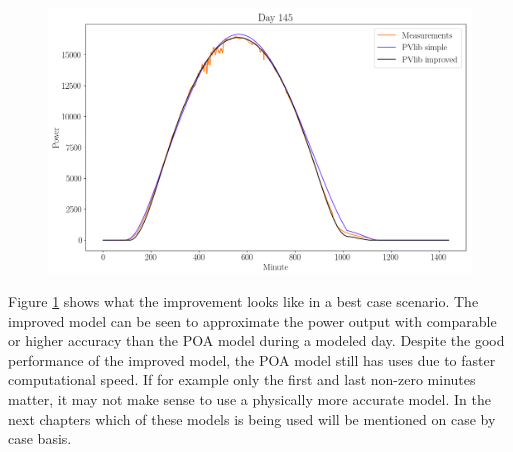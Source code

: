 \begin{figure}[h]
\centering
\includegraphics[width=0.99\linewidth]{pics/pvlibsimplecomplex}
\label{fig-poa_eval_simplecomplex}
\end{figure}

\noindent Figure \ref{fig-poa_eval_simplecomplex} shows what the improvement looks like in a best case scenario. The improved model can be seen to approximate the power output with comparable or higher accuracy than the POA model during a modeled day. Despite the good performance of the improved model, the POA model still has uses due to faster computational speed. If for example only the first and last non-zero minutes matter, it may not make sense to use a physically more accurate model. In the next chapters which of these models is being used will be mentioned on case by case basis.







